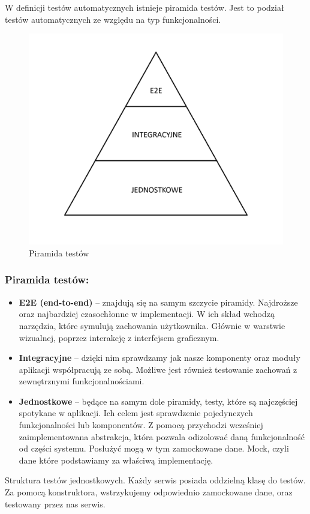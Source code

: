 \documentclass[a4paper,twoside,12pt]{book}
\begin{document}
W definicji testów automatycznych istnieje piramida testów. Jest to podział testów automatycznych ze względu na typ funkcjonalności.
\begin{figure}[H]
    \centering
    \includegraphics[width=1\textwidth]{testy.png}
    \caption{Piramida testów}
    \label{Tests}
\end{figure}

\subsubsection{Piramida testów:}
\begin{itemize}
    \item \textbf{E2E (end-to-end)} -- znajdują się na samym szczycie piramidy. Najdroższe oraz najbardziej czasochłonne w implementacji. W ich skład wchodzą narzędzia, które symulują zachowania użytkownika. Głównie w warstwie wizualnej, poprzez interakcję z interfejsem graficznym.
    \item \textbf{Integracyjne} -- dzięki nim sprawdzamy jak nasze komponenty oraz moduły aplikacji współpracują ze sobą. Możliwe jest również testowanie zachowań z zewnętrznymi funkcjonalnościami.
    \item \textbf{Jednostkowe} -- będące na samym dole piramidy, testy, które są najczęściej spotykane w aplikacji. Ich celem jest sprawdzenie pojedynczych funkcjonalności lub komponentów. Z pomocą przychodzi wcześniej zaimplementowana abstrakcja, która pozwala odizolować daną funkcjonalność od części systemu. Posłużyć mogą w tym zamockowane dane. Mock, czyli dane które podstawiamy za właściwą implementację.
\end{itemize}
Struktura testów jednostkowych. 
Każdy serwis posiada oddzielną klasę do testów. 
Za pomocą konstruktora, wstrzykujemy odpowiednio zamockowane dane, oraz testowany przez nas serwis.
\end{document}

